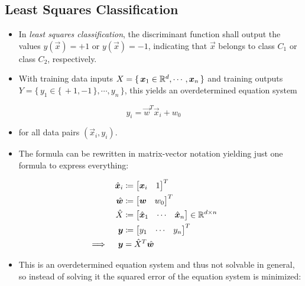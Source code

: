 		\subsection{Least Squares Classification}
			\begin{itemize}
				\item In \emph{least squares classification}, the discriminant function shall output the values \( y(\vec{x}) = +1 \) or \( y(\vec{x}) = -1 \), indicating that \(\vec{x}\) belongs to class \(C_1\) or class \(C_2\), respectively.
				\item With training data inputs \( X = \{\, \bm{x}_1 \in \mathbb{R}^d, \cdots, \bm{x}_n \,\} \) and training outputs \( Y = \{\, y_1 \in \{\, +1, -1 \,\}, \cdots, y_n \,\} \), this yields an overdetermined equation system
			\end{itemize}
			\begin{equation}
				y_i = \vec{w}^T \vec{x}_i + w_0
			\end{equation}
			\begin{itemize}
				\item[] for all data pairs \( (\vec{x}_i, y_i) \).
				\item The formula can be rewritten in matrix-vector notation yielding just one formula to express everything:
			\end{itemize}
			\begin{align}
				\hat{\bm{x}}_i &\coloneqq \begin{bmatrix} \bm{x}_i & 1 \end{bmatrix}^T \\
				\hat{\bm{w}} &\coloneqq \begin{bmatrix} \bm{w} & w_0 \end{bmatrix}^T \\
				\hat{X} &\coloneqq \begin{bmatrix} \hat{\bm{x}}_1 & \cdots & \hat{\bm{x}}_n \end{bmatrix} \in \mathbb{R}^{d \times n} \\
				\bm{y} &\coloneqq \begin{bmatrix} y_1 & \cdots & y_n \end{bmatrix}^T \\
				\implies\quad \bm{y} &= \hat{X}^T\hat{\bm{w}}
			\end{align}
			\begin{itemize}
				\item This is an overdetermined equation system and thus not solvable in general, so instead of solving it the squared error of the equation system is minimized:
			\end{itemize}

